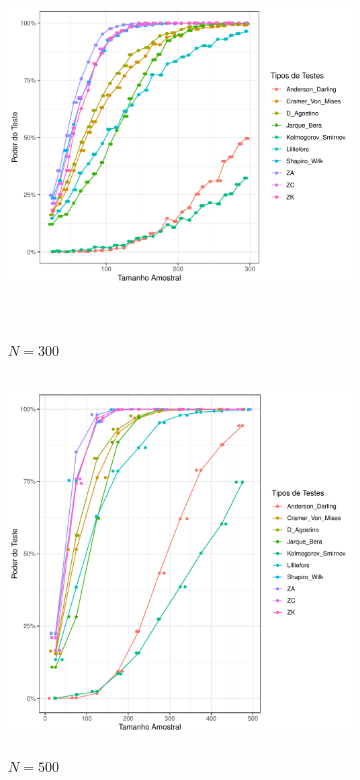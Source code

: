 \documentclass[final]{beamer}
\begin{document}
\begin{frame}[t]
\begin{columns}[t,totalwidth=0.6\paperwidth]
\begin{column}{0.45\textwidth}
\begin{figure}[H]
    \begin{subfigure}[b]{0.32\textwidth}
        \centering
        \includegraphics[height=10cm,keepaspectratio]{Distribuição_Beta/Poder_Teste/poder_teste_beta_300.pdf}
        \caption{\(N = 300\)}
    \end{subfigure}
    \hfill
    \begin{subfigure}[b]{0.33\textwidth}
        \centering
        \includegraphics[height=10cm,keepaspectratio]{Distribuição_Beta/Poder_Teste/poder_teste_beta_500.pdf}
        \caption{\(N = 500\)}
    \end{subfigure}
    \hfill
    \begin{subfigure}[b]{0.32\textwidth}
        \centering

\end{subfigure}
\end{figure}
\end{column}
\end{columns}
\end{frame}
\end{document}
